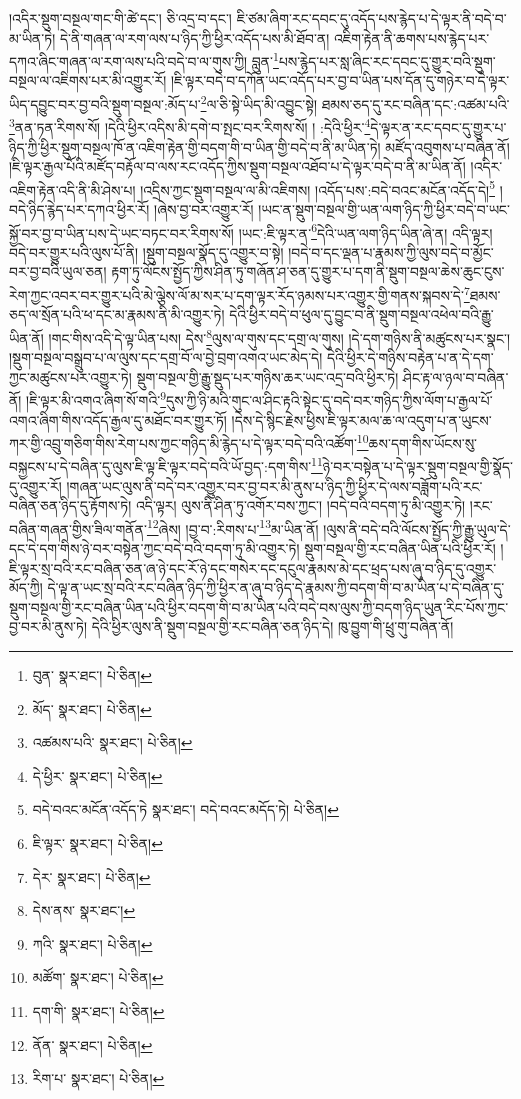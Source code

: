 །འདིར་སྡུག་བསྔལ་གང་གི་ཚེ་དང་། ཅི་འདྲ་བ་དང་། ཇི་ཙམ་ཞིག་རང་དབང་དུ་འདོད་པས་རྙེད་པ་དེ་ལྟར་ནི་བདེ་བ་མ་ཡིན་ཏེ། དེ་ནི་གཞན་ལ་རག་ལས་པ་ཉིད་ཀྱི་ཕྱིར་འདོད་པས་མི་ཐོབ་ན། འཇིག་རྟེན་ནི་ཆགས་པས་རྙེད་པར་དཀའ་ཞིང་གཞན་ལ་རག་ལས་པའི་བདེ་བ་ལ་གུས་ཀྱི། བླུན་\footnote{བུན་  སྣར་ཐང་།  པེ་ཅིན། }པས་རྙེད་པར་སླ་ཞིང་རང་དབང་དུ་གྱུར་བའི་སྡུག་བསྔལ་ལ་འཇིགས་པར་མི་འགྱུར་རོ། །ཇི་ལྟར་བདེ་བ་དཀོན་ཡང་འདོད་པར་བྱ་བ་ཡིན་པས་དོན་དུ་གཉེར་བ་དེ་ལྟར་ཡིད་དབྱུང་བར་བྱ་བའི་སྡུག་བསྔལ་:མོད་པ་\footnote{མོད་  སྣར་ཐང་།  པེ་ཅིན། }ལ་ཅི་སྟེ་ཡིད་མི་འབྱུང་སྟེ། ཐམས་ཅད་དུ་རང་བཞིན་དང་:འཚམ་པའི་\footnote{འཚམས་པའི་  སྣར་ཐང་།  པེ་ཅིན། }ནན་ཏན་རིགས་སོ། །དེའི་ཕྱིར་འདིས་མི་དགེ་བ་སྤང་བར་རིགས་སོ། །
:དེའི་ཕྱིར་\footnote{དེ་ཕྱིར་  སྣར་ཐང་།  པེ་ཅིན། }དེ་ལྟར་ན་རང་དབང་དུ་གྱུར་པ་ཉིད་ཀྱི་ཕྱིར་སྡུག་བསྔལ་ཁོ་ན་འཇིག་རྟེན་གྱི་བདག་གི་བ་ཡིན་གྱི་བདེ་བ་ནི་མ་ཡིན་ཏེ། མཛོད་འབུགས་པ་བཞིན་ནོ། །ཇི་ལྟར་རྒྱལ་པོའི་མཛོད་བརྟོལ་བ་ལས་རང་འདོད་ཀྱིས་སྡུག་བསྔལ་འཐོབ་པ་དེ་ལྟར་བདེ་བ་ནི་མ་ཡིན་ནོ། །འདིར་འཇིག་རྟེན་འདི་ནི་མི་ཤེས་པ། །འདྲིས་ཀྱང་སྡུག་བསྔལ་ལ་མི་འཇིགས། །འདོད་པས་:བདེ་བའང་མངོན་འདོད་དེ།\footnote{བདེ་བའང་མངོན་འདོད་ཏེ  སྣར་ཐང་། བདེ་བའང་མདོད་ཏེ།  པེ་ཅིན། } །བདེ་ཉིད་རྙེད་པར་དཀའ་ཕྱིར་རོ། །ཞེས་བྱ་བར་འགྱུར་རོ། །ཡང་ན་སྡུག་བསྔལ་གྱི་ཡན་ལག་ཉིད་ཀྱི་ཕྱིར་བདེ་བ་ཡང་སྐྱོ་བར་བྱ་བ་ཡིན་པས་དེ་ཡང་བཏང་བར་རིགས་སོ། །ཡང་:ཇི་ལྟར་ན་\footnote{ཇི་ལྟར་  སྣར་ཐང་།  པེ་ཅིན། }དེའི་ཡན་ལག་ཉིད་ཡིན་ཞེ་ན། འདི་ལྟར། བདེ་བར་གྱུར་པའི་ལུས་པོ་ནི། །སྡུག་བསྔལ་སྣོད་དུ་འགྱུར་བ་སྟེ། །བདེ་བ་དང་ལྡན་པ་རྣམས་ཀྱི་ལུས་བདེ་བ་མྱོང་བར་བྱ་བའི་ཡུལ་ཅན། རྟག་ཏུ་ལོངས་སྤྱོད་ཀྱིས་ཤིན་ཏུ་གཞོན་ཤ་ཅན་དུ་གྱུར་པ་དག་ནི་སྡུག་བསྔལ་ཆེས་ཆུང་ངུས་རེག་ཀྱང་འབར་བར་གྱུར་པའི་མེ་ལྕེས་ལོ་མ་སར་པ་དག་ལྟར་རོད་ཉམས་པར་འགྱུར་གྱི་གནས་སྐབས་དེ་\footnote{དེར་  སྣར་ཐང་།  པེ་ཅིན། }ཐམས་ཅད་ལ་སྲོན་པའི་ཕ་དང་མ་རྣམས་ནི་མི་འགྱུར་ཏེ། དེའི་ཕྱིར་བདེ་བ་ཕུལ་དུ་བྱུང་བ་ནི་སྡུག་བསྔལ་འཕེལ་བའི་རྒྱུ་ཡིན་ནོ། །གང་གིས་འདི་དེ་ལྟ་ཡིན་པས། དེས་\footnote{དེས་ནས་  སྣར་ཐང་། }ལུས་ལ་གུས་དང་དགྲ་ལ་གུས། །དེ་དག་གཉིས་ནི་མཚུངས་པར་སྣང་། །སྡུག་བསྔལ་བསྒྲུབ་པ་ལ་ལུས་དང་དགྲ་བོ་ལ་བྱེ་བྲག་འགའ་ཡང་མེད་དེ། དེའི་ཕྱིར་དེ་གཉིས་བརྟེན་པ་ན་དེ་དག་ཀྱང་མཚུངས་པར་འགྱུར་ཏེ། སྡུག་བསྔལ་གྱི་རྒྱུ་སྡུད་པར་གཉིས་ཆར་ཡང་འདྲ་བའི་ཕྱིར་ཏེ། ཤིང་རྟ་ལ་ཉལ་བ་བཞིན་ནོ། །ཇི་ལྟར་མི་འགའ་ཞིག་སོ་གའི་\footnote{ཀའི་  སྣར་ཐང་།  པེ་ཅིན། }དུས་ཀྱི་ཉི་མའི་གུང་ལ་ཤིང་རྟའི་སྟེང་དུ་བདེ་བར་གཉིད་ཀྱིས་ལོག་པ་རྒྱལ་པོ་འགའ་ཞིག་གིས་འདོད་རྒྱལ་དུ་མཐོང་བར་གྱུར་ཏོ། །དེས་དེ་སྙིང་རྗེས་ཕྱིས་ཇི་ལྟར་མལ་ཆ་ལ་འདུག་པ་ན་ཡུངས་ཀར་གྱི་འབྲུ་གཅིག་གིས་རེག་པས་ཀྱང་གཉིད་མི་རྙེད་པ་དེ་ལྟར་བདེ་བའི་འཚོག་\footnote{མཚོག་  སྣར་ཐང་།  པེ་ཅིན། }ཆས་དག་གིས་ཡོངས་སུ་བསྐྱངས་པ་དེ་བཞིན་དུ་ལུས་ཇི་ལྟ་ཇི་ལྟར་བདེ་བའི་ཡོ་བྱད་:དག་གིས་\footnote{དག་གི་  སྣར་ཐང་།  པེ་ཅིན། }ཉེ་བར་བསྟེན་པ་དེ་ལྟར་སྡུག་བསྔལ་གྱི་སྣོད་དུ་འགྱུར་རོ། །གཞན་ཡང་ལུས་ནི་བདེ་བར་འགྱུར་བར་བྱ་བར་མི་ནུས་པ་ཉིད་ཀྱི་ཕྱིར་དེ་ལས་བཟློག་པའི་རང་བཞིན་ཅན་ཉིད་དུ་རྟོགས་ཏེ། འདི་ལྟར། ལུས་ནི་ཤིན་ཏུ་འགོར་བས་ཀྱང་། །བདེ་བའི་བདག་ཏུ་མི་འགྱུར་ཏེ། །རང་བཞིན་གཞན་གྱིས་ཟིལ་གནོན་\footnote{ནོན་  སྣར་ཐང་།  པེ་ཅིན། }ཞེས། །བྱ་བ་:རིགས་པ་\footnote{རིག་པ་  སྣར་ཐང་།  པེ་ཅིན། }མ་ཡིན་ནོ། །ལུས་ནི་བདེ་བའི་ལོངས་སྤྱོད་ཀྱི་རྒྱུ་ཡུལ་དེ་དང་དེ་དག་གིས་ཉེ་བར་བསྟེན་ཀྱང་བདེ་བའི་བདག་ཏུ་མི་འགྱུར་ཏེ། སྡུག་བསྔལ་གྱི་རང་བཞིན་ཡིན་པའི་ཕྱིར་རོ། །ཇི་ལྟར་སྲ་བའི་རང་བཞིན་ཅན་ཞ་ཉེ་དང་རོ་ཉེ་དང་གསེར་དང་དངུལ་རྣམས་མེ་དང་ཕྲད་པས་ཞུ་བ་ཉིད་དུ་འགྱུར་མོད་ཀྱི། དེ་ལྟ་ན་ཡང་སྲ་བའི་རང་བཞིན་ཉིད་ཀྱི་ཕྱིར་ན་ཞུ་བ་ཉིད་དེ་རྣམས་ཀྱི་བདག་གི་བ་མ་ཡིན་པ་དེ་བཞིན་དུ་སྡུག་བསྔལ་གྱི་རང་བཞིན་ཡིན་པའི་ཕྱིར་བདག་གི་བ་མ་ཡིན་པའི་བདེ་བས་ལུས་ཀྱི་བདག་ཉིད་ཡུན་རིང་པོས་ཀྱང་བྱ་བར་མི་ནུས་ཏེ། དེའི་ཕྱིར་ལུས་ནི་སྡུག་བསྔལ་གྱི་རང་བཞིན་ཅན་ཉིད་དེ། ཁུ་བྱུག་གི་ཕྲུ་གུ་བཞིན་ནོ། 